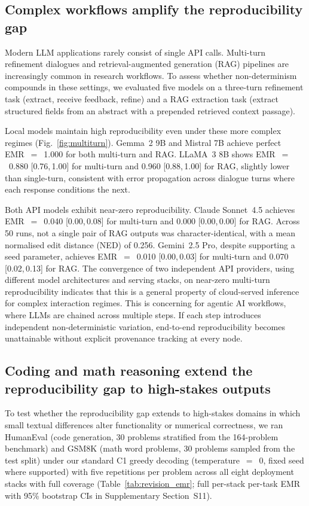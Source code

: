\documentclass[sn-nature]{sn-jnl}
\begin{document}
\subsection{Complex workflows amplify the reproducibility gap}\label{subsec:multiturn}

Modern LLM applications rarely consist of single API calls.
Multi-turn refinement dialogues and retrieval-augmented generation (RAG) pipelines are increasingly common in research workflows.
To assess whether non-determinism compounds in these settings, we evaluated five models on a three-turn refinement task (extract, receive feedback, refine) and a RAG extraction task (extract structured fields from an abstract with a prepended retrieved context passage).

Local models maintain high reproducibility even under these more complex regimes (Fig.~\ref{fig:multiturn}).
Gemma~2 9B and Mistral 7B achieve perfect EMR~$=$~1.000 for both multi-turn and RAG.
LLaMA~3 8B shows EMR~$=$~0.880 [0.76,\,1.00] for multi-turn and 0.960 [0.88,\,1.00] for RAG, slightly lower than single-turn, consistent with error propagation across dialogue turns where each response conditions the next.

Both API models exhibit near-zero reproducibility.
Claude Sonnet~4.5 achieves EMR~$=$~0.040 [0.00,\,0.08] for multi-turn and 0.000 [0.00,\,0.00] for RAG. Across 50 runs, not a single pair of RAG outputs was character-identical, with a mean normalised edit distance (NED) of 0.256.
Gemini~2.5 Pro, despite supporting a seed parameter, achieves EMR~$=$~0.010 [0.00,\,0.03] for multi-turn and 0.070 [0.02,\,0.13] for RAG.
The convergence of two independent API providers, using different model architectures and serving stacks, on near-zero multi-turn reproducibility indicates that this is a general property of cloud-served inference for complex interaction regimes.
This is concerning for agentic AI workflows, where LLMs are chained across multiple steps.
If each step introduces independent non-deterministic variation, end-to-end reproducibility becomes unattainable without explicit provenance tracking at every node.


\subsection{Coding and math reasoning extend the reproducibility gap to high-stakes outputs}\label{subsec:codemath}

To test whether the reproducibility gap extends to high-stakes domains in which small textual differences alter functionality or numerical correctness, we ran HumanEval (code generation, 30 problems stratified from the 164-problem benchmark\cite{chen2021humaneval}) and GSM8K (math word problems, 30 problems sampled from the test split\cite{cobbe2021gsm8k}) under our standard C1 greedy decoding (temperature~$=$~0, fixed seed where supported) with five repetitions per problem across all eight deployment stacks with full coverage (Table~\ref{tab:revision_emr}; full per-stack per-task EMR with 95\% bootstrap CIs in Supplementary Section~S11).
\end{document}
